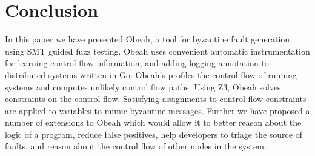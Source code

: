 \section{Conclusion}
\label{sec:conclusion}

In this paper we have presented Obeah, a tool for byzantine fault generation
using SMT guided fuzz testing. Obeah uses convenient automatic instrumentation
for learning control flow information, and adding logging annotation to
distributed systems written in Go. Obeah's profiles the control flow of running
systems and computes unlikely control flow paths. Using Z3, Obeah solves
constraints on the control flow. Satisfying assignments to control flow
constraints are applied to variables to mimic byzantine messages. Further we have
proposed a number of extensions to Obeah which would allow it to better reason
about the logic of a program, reduce false positives, help developers to triage
the source of faults, and reason about the control flow of other nodes in the
system.
